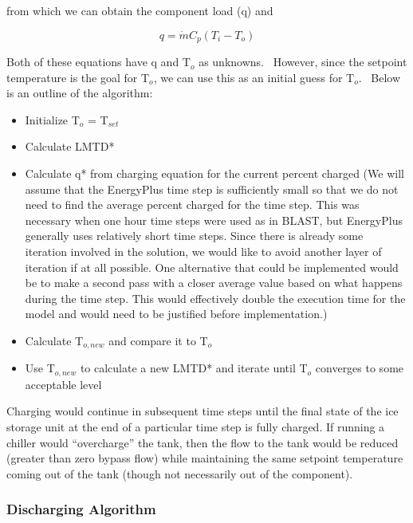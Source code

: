 from which we can obtain the component load (q) and

\begin{equation}
q = \dot m{C_p}\left( {{T_i} - {T_o}} \right)
\end{equation}

Both of these equations have q and T\(_{o}\) as unknowns.~ However, since the setpoint temperature is the goal for T\(_{o}\), we can use this as an initial guess for T\(_{o}\).~ Below is an outline of the algorithm:

\begin{itemize}
  \item
    Initialize T\(_{o}\) = T\(_{set}\)
  \item
    Calculate LMTD*
  \item
    Calculate q* from charging equation for the current percent charged (We will assume that the EnergyPlus time step is sufficiently small so that we do not need to find the average percent charged for the time step. This was necessary when one hour time steps were used as in BLAST, but EnergyPlus generally uses relatively short time steps. Since there is already some iteration involved in the solution, we would like to avoid another layer of iteration if at all possible. One alternative that could be implemented would be to make a second pass with a closer average value based on what happens during the time step. This would effectively double the execution time for the model and would need to be justified before implementation.)
  \item
    Calculate T\(_{o,new}\) and compare it to T\(_{o}\)
  \item
    Use T\(_{o,new}\) to calculate a new LMTD* and iterate until T\(_{o}\) converges to some acceptable level
\end{itemize}

Charging would continue in subsequent time steps until the final state of the ice storage unit at the end of a particular time step is fully charged. If running a chiller would ``overcharge'' the tank, then the flow to the tank would be reduced (greater than zero bypass flow) while maintaining the same setpoint temperature coming out of the tank (though not necessarily out of the component).

\subsubsection{Discharging Algorithm}\label{discharging-algorithm}

